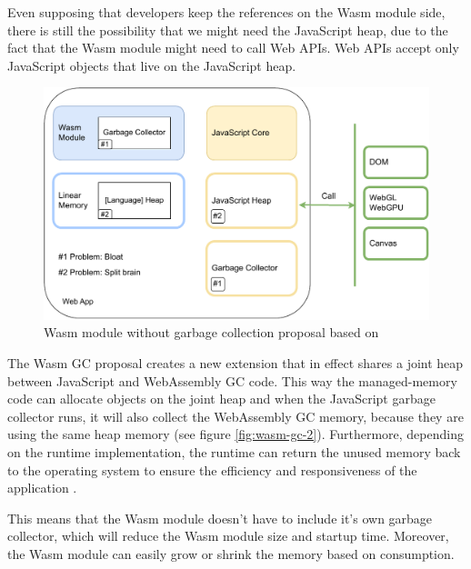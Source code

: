 Even supposing that developers keep the references on the Wasm module side, there is still the possibility that we might need the JavaScript heap, due to the fact that the Wasm module might need to call Web APIs. Web APIs accept only JavaScript objects that live on the JavaScript heap. 
%
\begin{figure}[htbp]
  \centering
      \includegraphics[width=1\linewidth]{images/wasm/wasm_gc_1.drawio.pdf}
  \caption{Wasm module without garbage collection proposal based on \cite{sekhar_2023_mobile}}
  \label{fig:wasm-gc-1}
\end{figure}
%
The Wasm GC proposal creates a new extension that in effect shares a joint heap between JavaScript and WebAssembly GC code. This way the managed-memory code can allocate objects on the joint heap and when the JavaScript garbage collector runs, it will also collect the WebAssembly GC memory, because they are using the same heap memory (see figure \ref{fig:wasm-gc-2}). Furthermore, depending on the runtime implementation, the runtime can return the unused memory back to the operating system to ensure the efficiency and responsiveness of the application \cite{sekhar_2023_mobile}. 

This means that the Wasm module doesn't have to include it's own garbage collector, which will reduce the Wasm module size and startup time. Moreover, the Wasm module can easily grow or shrink the memory based on consumption. 

